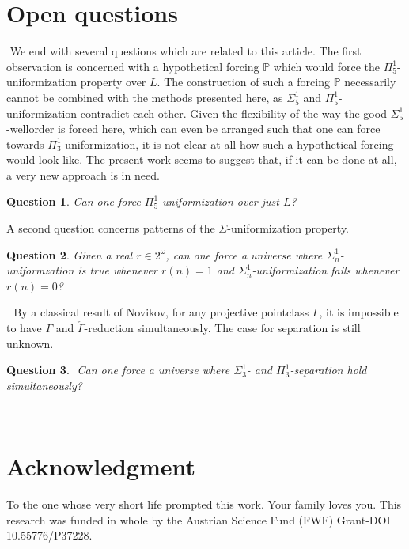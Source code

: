\documentclass[a4paper,11pt]{article}
\newtheorem{question}{Question}
\newcommand{\forceP}{\mathbb{P}}
\begin{document}
    \section{Open questions}
    ﻿
    We end with several questions which are related to this article.
    The first observation is concerned with a hypothetical forcing $\forceP$ which would force the $\Pi^1_5$-uniformization property over $L$.
    The construction of such a forcing $\forceP$ necessarily cannot be combined with the methods presented here, as $\Sigma^1_5$ and $\Pi^1_5$-uniformization contradict each other. Given the flexibility of the way the good $\Sigma^1_5$-wellorder is forced here, which can even be arranged such that one can force towards $\Pi^1_3$-uniformization, it is not clear at all how such a hypothetical forcing would look like. The present work seems to suggest that, if it can be done at all, a very new approach is in need.
    \begin{question}
   Can one force $\Pi^1_5$-uniformization over just $L$?
    \end{question}
    A second question concerns patterns of the $\Sigma$-uniformization property. 
        \begin{question}
    Given a real $r \in 2^{\omega}$, can one force a universe where $\Sigma^1_n$-uniformzation is true whenever $r(n)=1$ and $\Sigma^1_n$-uniformization fails whenever $r(n)=0$?
    \end{question}
    ﻿
    ﻿
    By a classical result of Novikov, for any projective pointclass $\Gamma$, it is impossible to have $\Gamma$ and $\check{\Gamma}$-reduction simultaneously. The case  for separation is still unknown.
    ﻿
    \begin{question}
    ﻿
    Can one force a universe where $\Sigma^1_3$- and $\Pi^1_3$-separation hold simultaneously?
    ﻿
    \end{question}
    ﻿
    ﻿\section{Acknowledgment}
 
 To the one whose very short life prompted this work. Your family loves you.
 This research was funded in whole by the Austrian Science Fund (FWF) Grant-DOI 10.55776/P37228.
    
\end{document}
